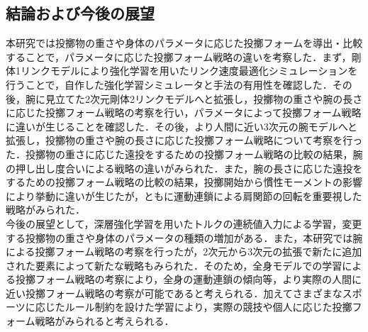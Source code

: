 \begin{small}
\section{結論および今後の展望}
本研究では投擲物の重さや身体のパラメータに応じた投擲フォームを導出・比較することで，パラメータに応じた投擲フォーム戦略の違いを考察した．まず，剛体1リンクモデルにより強化学習を用いたリンク速度最適化シミュレーションを行うことで，自作した強化学習シミュレータと手法の有用性を確認した．その後，腕に見立てた2次元剛体2リンクモデルへと拡張し，投擲物の重さや腕の長さに応じた投擲フォーム戦略の考察を行い，パラメータによって投擲フォーム戦略に違いが生じることを確認した．その後，より人間に近い3次元の腕モデルへと拡張し，投擲物の重さや腕の長さに応じた投擲フォーム戦略について考察を行った．投擲物の重さに応じた遠投をするための投擲フォーム戦略の比較の結果，腕の押し出し度合いによる戦略の違いがみられた．また，腕の長さに応じた遠投をするための投擲フォーム戦略の比較の結果，投擲開始から慣性モーメントの影響により挙動に違いが生じたが，ともに運動連鎖による肩関節の回転を重要視した戦略がみられた．\\
今後の展望として，深層強化学習を用いたトルクの連続値入力による学習，変更する投擲物の重さや身体のパラメータの種類の増加がある．また，本研究では腕による投擲フォーム戦略の考察を行ったが，2次元から3次元の拡張で新たに追加された要素によって新たな戦略もみられた．そのため，全身モデルでの学習による投擲フォーム戦略の考察により，全身の運動連鎖の傾向等，より実際の人間に近い投擲フォーム戦略の考察が可能であると考えられる．加えてさまざまなスポーツに応じたルール制約を設けた学習により，実際の競技や個人に応じた投擲フォーム戦略がみられると考えられる．






{


}

\end{small}

